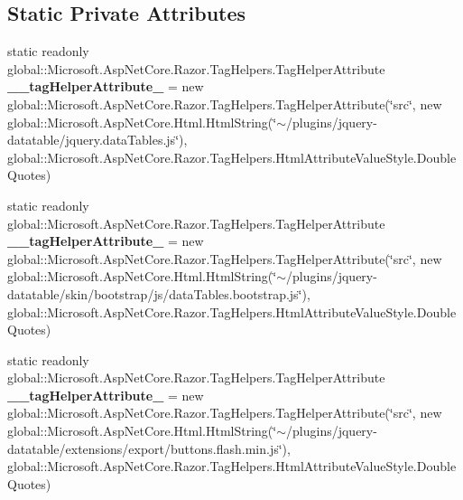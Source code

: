 \subsection*{Static Private Attributes}
\begin{DoxyCompactItemize}
\item 
\mbox{\label{class_asp_net_core_1_1_views___account_movements___index_ae9b73f1d256180269cc53cb5cfd9c087}} 
static readonly global\+::\+Microsoft.\+Asp\+Net\+Core.\+Razor.\+Tag\+Helpers.\+Tag\+Helper\+Attribute {\bfseries \+\_\+\+\_\+tag\+Helper\+Attribute\+\_} = new global\+::\+Microsoft.\+Asp\+Net\+Core.\+Razor.\+Tag\+Helpers.\+Tag\+Helper\+Attribute(\char`\"{}src\char`\"{}, new global\+::\+Microsoft.\+Asp\+Net\+Core.\+Html.\+Html\+String(\char`\"{}$\sim$/plugins/jquery-\/datatable/jquery.\+data\+Tables.\+js\char`\"{}), global\+::\+Microsoft.\+Asp\+Net\+Core.\+Razor.\+Tag\+Helpers.\+Html\+Attribute\+Value\+Style.\+Double\+Quotes)
\item 
\mbox{\label{class_asp_net_core_1_1_views___account_movements___index_a3f1881bea4fa05ae9fc56c58dfaa4298}} 
static readonly global\+::\+Microsoft.\+Asp\+Net\+Core.\+Razor.\+Tag\+Helpers.\+Tag\+Helper\+Attribute {\bfseries \+\_\+\+\_\+tag\+Helper\+Attribute\+\_} = new global\+::\+Microsoft.\+Asp\+Net\+Core.\+Razor.\+Tag\+Helpers.\+Tag\+Helper\+Attribute(\char`\"{}src\char`\"{}, new global\+::\+Microsoft.\+Asp\+Net\+Core.\+Html.\+Html\+String(\char`\"{}$\sim$/plugins/jquery-\/datatable/skin/bootstrap/js/data\+Tables.\+bootstrap.\+js\char`\"{}), global\+::\+Microsoft.\+Asp\+Net\+Core.\+Razor.\+Tag\+Helpers.\+Html\+Attribute\+Value\+Style.\+Double\+Quotes)
\item 
\mbox{\label{class_asp_net_core_1_1_views___account_movements___index_aea5273c1a60b4bec589c6e211c1f855e}} 
static readonly global\+::\+Microsoft.\+Asp\+Net\+Core.\+Razor.\+Tag\+Helpers.\+Tag\+Helper\+Attribute {\bfseries \+\_\+\+\_\+tag\+Helper\+Attribute\+\_} = new global\+::\+Microsoft.\+Asp\+Net\+Core.\+Razor.\+Tag\+Helpers.\+Tag\+Helper\+Attribute(\char`\"{}src\char`\"{}, new global\+::\+Microsoft.\+Asp\+Net\+Core.\+Html.\+Html\+String(\char`\"{}$\sim$/plugins/jquery-\/datatable/extensions/export/buttons.\+flash.\+min.\+js\char`\"{}), global\+::\+Microsoft.\+Asp\+Net\+Core.\+Razor.\+Tag\+Helpers.\+Html\+Attribute\+Value\+Style.\+Double\+Quotes)

\end{DoxyCompactItemize}
